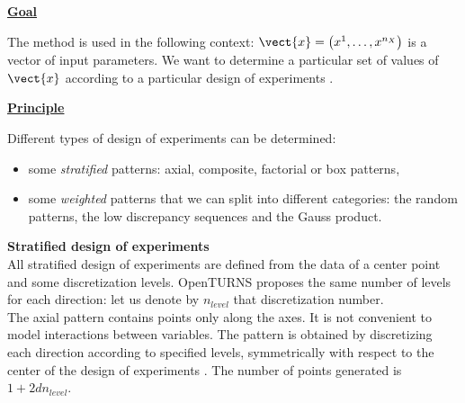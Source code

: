 \renewcommand{\etapemethodo}{C}
\renewcommand{\nomfichier}{docref_C11_ExperimentPlanes}
\renewcommand{\titrefiche}{Design of Experiments}

\Header

\MathematicalDescription
    {
      \underline{\textbf{Goal}} \vspace{2mm}

      The method is used in the following context: $\vect{x}= \left( x^1,\ldots,x^{n_X} \right)$ is a vector of input parameters. We want to determine a particular set of values of $\vect{x}$ according to a particular design of experiments .
      \vspace*{2mm}

      \underline{\textbf{Principle}}
      \vspace{2mm}

      Different types of design of experiments can be determined:
      \begin{itemize}
      \item some \emph{stratified} patterns: axial, composite, factorial or box patterns,
      \item some \emph{weighted} patterns that we can split into different categories: the random patterns, the low discrepancy sequences and the Gauss product.
      \end{itemize}

      \vspace*{2mm}

      {\bf Stratified design of experiments }\\

      All stratified design of experiments are defined from the data of a center point and some discretization levels. OpenTURNS proposes the same number of levels for each direction: let us denote by $n_{level}$ that discretization number.\\

      The axial pattern contains points only along the axes. It is not convenient to model interactions between variables. The pattern is obtained by discretizing each direction according to specified levels, symmetrically with respect to the center of the design of experiments . The number of points generated is $1 + 2dn_{level}$.\\

}
